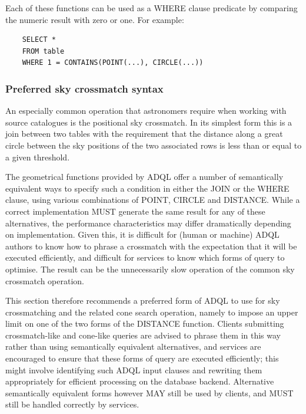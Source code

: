 \documentclass[11pt,a4paper]{ivoa}
\begin{document}
Each of these functions can be used as a WHERE clause predicate by
comparing the numeric result with zero or one.
For example:
\begin{verbatim}
    SELECT *
    FROM table
    WHERE 1 = CONTAINS(POINT(...), CIRCLE(...))
\end{verbatim}


\subsubsection{Preferred sky crossmatch syntax}
\label{sec:functions.geom.crossmatch}

An especially common operation that astronomers require when working
with source catalogues is the positional sky crossmatch.
In its simplest form this is a join between two tables with the
requirement that the distance along a great circle between the
sky positions of the two associated rows is less than or equal to
a given threshold.

The geometrical functions provided by ADQL offer a number of
semantically equivalent ways to specify such a condition
in either the JOIN or the WHERE clause, using various
combinations of POINT, CIRCLE and DISTANCE.
While a correct implementation MUST generate the same result for
any of these alternatives, the performance characteristics may
differ dramatically depending on implementation.
Given this, it is difficult for (human or machine) ADQL authors
to know how to phrase a crossmatch with the expectation that it
will be executed efficiently, and difficult for services to know
which forms of query to optimise.  The result can be the
unnecessarily slow operation of the common sky crossmatch operation.

This section therefore recommends a preferred form of ADQL
to use for sky crossmatching and the related cone search operation,
namely to impose an upper limit on one of the two forms of the
DISTANCE function.
Clients submitting crossmatch-like and cone-like
queries are advised to phrase them in this way rather than using semantically
equivalent alternatives, and services are encouraged to ensure that
these forms of query are executed efficiently; this might involve
identifying such ADQL input clauses and rewriting them appropriately
for efficient processing on the database backend.
Alternative semantically equivalent forms however MAY still be
used by clients, and MUST still be handled correctly by services.
\end{document}
